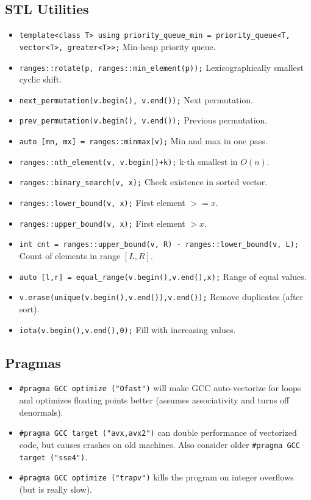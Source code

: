 	\subsection{STL Utilities}
		\begin{itemize}
			\item \lstinline{template<class T> using priority_queue_min = priority_queue<T, vector<T>, greater<T>>;} Min-heap priority queue.
			\item \lstinline{ranges::rotate(p, ranges::min_element(p));} Lexicographically smallest cyclic shift.
			\item \lstinline{next_permutation(v.begin(), v.end());} Next permutation.
			\item \lstinline{prev_permutation(v.begin(), v.end());} Previous permutation.
			\item \lstinline{auto [mn, mx] = ranges::minmax(v);} Min and max in one pass.
			\item \lstinline{ranges::nth_element(v, v.begin()+k);} k-th smallest in $O(n)$.
			\item \lstinline{ranges::binary_search(v, x);} Check existence in sorted vector.
			\item \lstinline{ranges::lower_bound(v, x);} First element $>= x$.
			\item \lstinline{ranges::upper_bound(v, x);} First element $> x$.
			\item \lstinline{int cnt = ranges::upper_bound(v, R) - ranges::lower_bound(v, L);} Count of elements in range $[L,R]$.
			\item \lstinline{auto [l,r] = equal_range(v.begin(),v.end(),x);} Range of equal values.
			\item \lstinline{v.erase(unique(v.begin(),v.end()),v.end());} Remove duplicates (after sort).
			\item \lstinline{iota(v.begin(),v.end(),0);} Fill with increasing values.
		\end{itemize}
	\subsection{Pragmas}
	
		\begin{itemize}
			\item \lstinline{#pragma GCC optimize ("Ofast")} will make GCC auto-vectorize for loops and optimizes floating points better (assumes associativity and turns off denormals).
			\item \lstinline{#pragma GCC target ("avx,avx2")} can double performance of vectorized code, but causes crashes on old machines. Also consider older \lstinline{#pragma GCC target ("sse4")}.
			\item \lstinline{#pragma GCC optimize ("trapv")} kills the program on integer overflows (but is really slow).
		\end{itemize}

